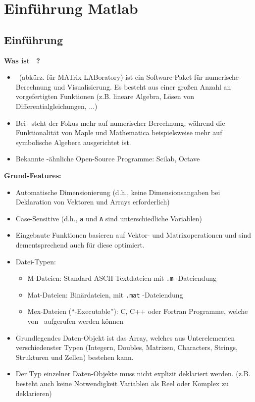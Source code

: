 \clearpage
\setcounter{page}{1}

\section{Einführung Matlab \label{sec:einmat}}



\subsection*{Einführung}

{\bf Was ist \matl\ ?}
\begin{itemize}
\item \matl\ (abkürz. für MATrix LABoratory) ist ein Software-Paket für numerische Berechnung und Visualisierung.
Es besteht aus einer großen Anzahl an vorgefertigten Funktionen (z.B. lineare Algebra, Lösen von Differentialgleichungen, ...)

\item  Bei \matl\ steht der Fokus mehr auf numerischer Berechnung, während die Funktionalität von {\sc Maple} und {\sc Mathematica} beispielsweise mehr auf symbolische Algebera ausgerichtet ist.

\item Bekannte \matl-ähnliche Open-Source Programme: {\sc Scilab}, {\sc Octave}
\end{itemize}


{\bf Grund-Features:}
\begin{itemize}
\item Automatische Dimensionierung (d.h., keine Dimensionsangaben bei Deklaration von Vektoren und Arrays erforderlich)

\item Case-Sensitive (d.h., \verb(a( und \verb(A( sind unterschiedliche Variablen)

\item Eingebaute Funktionen basieren auf Vektor- und Matrixoperationen und sind dementsprechend auch für diese optimiert.

\item Datei-Typen:
\begin{itemize}
 \item M-Dateien: Standard ASCII Textdateien mit \verb(.m( -Dateiendung
 \item Mat-Dateien: Binärdateien, mit \verb(.mat( -Dateiendung
 \item Mex-Dateien (``\matl-Executable''): C, C++ oder Fortran Programme, welche von \matl\ aufgerufen werden können
\end{itemize}

\item Grundlegendes Daten-Objekt ist das Array, welches aus Unterelementen verschiedenster Typen (Integern, Doubles, Matrizen, Characters, Strings, Strukturen und Zellen) bestehen kann.

\item Der Typ einzelner Daten-Objekte muss nicht explizit deklariert werden. (z.B. besteht auch keine Notwendigkeit Variablen als Reel oder Komplex zu deklarieren)
\end{itemize}



